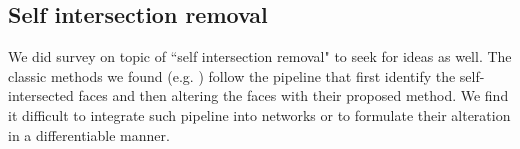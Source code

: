 \subsection{Self intersection removal}
We did survey on topic of ``self intersection removal" to seek for ideas as well. The classic methods we found (e.g. \cite{edgeswap,removeoffset}) follow the pipeline that first identify the self-intersected faces and then altering the faces with their proposed method. We find it difficult to integrate such pipeline into networks or to formulate their alteration in a differentiable manner.\\


